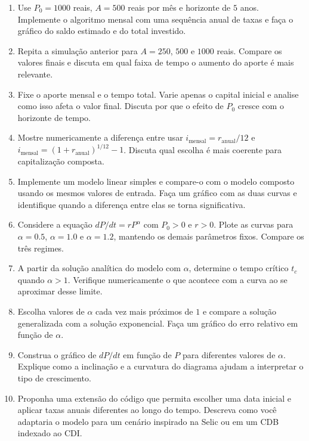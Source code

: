 \documentclass[11pt,a4paper]{article}
\begin{document}
\begin{enumerate}[leftmargin=*, itemsep=0.8em]
    \item Use \(P_0=1000\) reais, \(A=500\) reais por mês e horizonte de \(5\) anos.
    Implemente o algoritmo mensal com uma sequência anual de taxas e faça o gráfico do
    saldo estimado e do total investido.

    \item Repita a simulação anterior para \(A=250\), \(500\) e \(1000\) reais. Compare os
    valores finais e discuta em qual faixa de tempo o aumento do aporte é mais relevante.

    \item Fixe o aporte mensal e o tempo total. Varie apenas o capital inicial e analise como
    isso afeta o valor final. Discuta por que o efeito de \(P_0\) cresce com o horizonte de
    tempo.

    \item Mostre numericamente a diferença entre usar
    \(i_{\text{mensal}} = r_{\text{anual}}/12\) e
    \(i_{\text{mensal}} = (1+r_{\text{anual}})^{1/12}-1\). Discuta qual escolha é mais
    coerente para capitalização composta.

    \item Implemente um modelo linear simples e compare-o com o modelo composto usando os
    mesmos valores de entrada. Faça um gráfico com as duas curvas e identifique quando a
    diferença entre elas se torna significativa.

    \item Considere a equação \(dP/dt = rP^{\alpha}\) com \(P_0>0\) e \(r>0\). Plote as
    curvas para \(\alpha = 0.5\), \(\alpha = 1.0\) e \(\alpha = 1.2\), mantendo os demais
    parâmetros fixos. Compare os três regimes.

    \item A partir da solução analítica do modelo com \(\alpha\), determine o tempo crítico
    \(t_c\) quando \(\alpha>1\). Verifique numericamente o que acontece com a curva ao se
    aproximar desse limite.

    \item Escolha valores de \(\alpha\) cada vez mais próximos de \(1\) e compare a solução
    generalizada com a solução exponencial. Faça um gráfico do erro relativo em função de
    \(\alpha\).

    \item Construa o gráfico de \(dP/dt\) em função de \(P\) para diferentes valores de
    \(\alpha\). Explique como a inclinação e a curvatura do diagrama ajudam a interpretar o
    tipo de crescimento.

    \item Proponha uma extensão do código que permita escolher uma data inicial e aplicar
    taxas anuais diferentes ao longo do tempo. Descreva como você adaptaria o modelo para
    um cenário inspirado na Selic ou em um CDB indexado ao CDI.
\end{enumerate}
\end{document}
